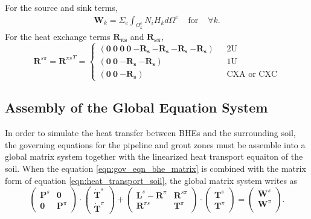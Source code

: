 For the source and sink terms, 
\begin{equation}
\begin{array}{lll}
\bm{W}_{k} = \Sigma_{e} \int_{\Omega_k^e} N_i H_k d\Omega^e 
&\mbox{~for~}& \forall k. 
\end{array}
\end{equation}
For the heat exchange terms $\bm{R_{\pi s}}$ and $\bm{R_{s \pi}}$, 
\begin{equation}
\bm{R}^{s \pi} = {\bm{R}^{\pi s}}^{T} = \left\{ \begin{array}{ll}
(\bm{0}~\bm{0}~\bm{0}~\bm{0}~\bm{-R_s}~\bm{-R_s}~\bm{-R_s}~\bm{-R_s}) 
   & \mbox{~~2U} \\
(\bm{0}~\bm{0}~\bm{-R_s}~\bm{-R_s}) 
   & \mbox{~~1U} \\
(\bm{0}~\bm{0}~\bm{-R_s}) 
   & \mbox{~~CXA or CXC} 
       \end{array} \right.
\end{equation}
\subsection{Assembly of the Global Equation System}
In order to simulate the heat transfer between BHEs and the surrounding soil, the governing equations for the pipeline and grout zones must be assemble into a global matrix system together with the linearized heat transport equaiton of the soil. When the equation \ref{eqn:gov_eqn_bhe_matrix} is combined with the matrix form of equation \ref{eqn:heat_transport_soil}, the global matrix system writes as
\begin{equation}
\label{eqn:global_matrix_form}
\left( \begin{array}{cc}
\bm{P}^s & \bm{0} \\
\bm{0}   & \bm{P}^\pi
\end{array} \right) 
\cdot 
\left(
\begin{array}{c}
\bm{\dot{T}}^s \\
\bm{\dot{T}}^\pi
\end{array} \right) 
+ \left( \begin{array}{cc}
\bm{L}^s - \bm{R}^\pi & \bm{R}^{s \pi}\\
\bm{R}^{\pi s} & \bm{T}^\pi
\end{array}
\right) 
\cdot 
\left(\begin{array}{c}
\bm{T}^s \\
\bm{T}^\pi
\end{array} \right) 
= \left( 
\begin{array}{c}
\bm{W}^s \\
\bm{W}^\pi \\
\end{array} \right). 
\end{equation}

